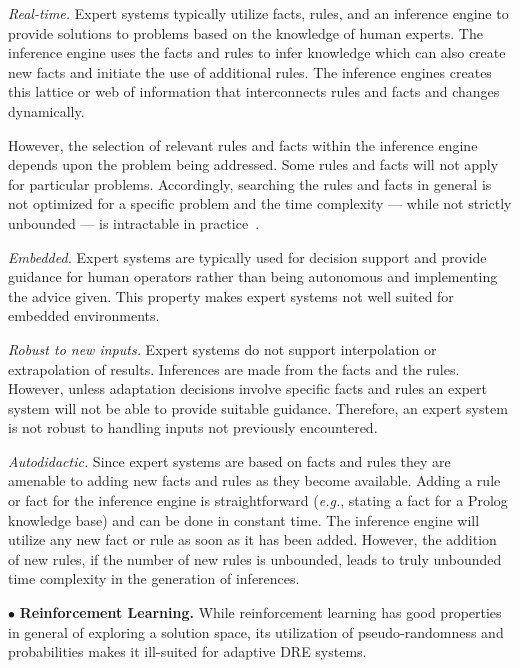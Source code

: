 \documentclass[conference]{IEEEtran}
\begin{document}
\emph{Real-time.} Expert systems typically utilize facts, rules, and an inference engine to provide solutions to problems based on the knowledge of human experts. The inference engine uses the facts and rules to infer knowledge which can also create new facts and initiate the use of additional rules. The inference engines creates this lattice or web of information that interconnects rules and facts and changes dynamically.

However, the selection of relevant rules and facts within the inference engine depends upon the problem being addressed. Some rules and facts will not apply for particular problems. Accordingly, searching the rules and facts in general is not optimized for a specific problem and the time complexity --- while not strictly unbounded --- is intractable in practice~\cite{Sebesta:16}.

\emph{Embedded.} Expert systems are typically used for decision support and provide guidance for human operators rather than being autonomous and implementing the advice given. This property makes expert systems not well suited for embedded environments.

\emph{Robust to new inputs.} Expert systems do not support interpolation or extrapolation of results. Inferences are made from the facts and the rules. However, unless adaptation decisions involve specific facts and rules an expert system will not be able to provide suitable guidance. Therefore, an expert system is not robust to handling inputs not previously encountered.

\emph{Autodidactic.} Since expert systems are based on facts and rules they are amenable to adding new facts and rules as they become available. Adding a rule or fact for the inference engine is straightforward (\emph{e.g.}, stating a fact for a Prolog knowledge base) and can be done in constant time. The inference engine will utilize any new fact or rule as soon as it has been added. However, the addition of new rules, if the number of new rules is unbounded, leads to truly unbounded time complexity in the generation of inferences.


$\bullet$ {\bf Reinforcement Learning.} While reinforcement learning has good properties in general of exploring a solution space, its utilization of pseudo-randomness and probabilities makes it ill-suited for adaptive DRE systems.
\end{document}
